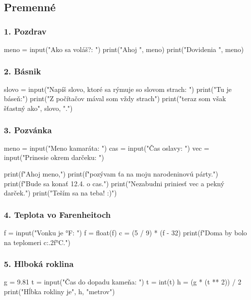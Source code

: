 \subsection{Premenné}
\subsubsection*{1. Pozdrav}
\begin{solution}
meno = input("Ako sa voláš?: ")
print("Ahoj ", meno)
print("Dovidenia ", meno)
\end{solution}

\subsubsection*{2. Básnik}
\begin{solution}
slovo = input("Napíš slovo, ktoré sa rýmuje so slovom strach: ")
print("Tu je báseň:")
print("Z počítačov mával som vždy strach")
print("teraz som však šťastný ako", slovo, ".")
\end{solution}

\subsubsection*{3. Pozvánka}
\begin{solution}
meno = input("Meno kamaráta: ")
cas = input("Čas oslavy: ")
vec = input("Prinesie okrem darčeku: ")

print(f"Ahoj {meno},")
print(f"pozývam ťa na moju narodeninovú párty.")
print(f"Bude sa konať 12.4. o {cas}.")
print("Nezabudni priniesť {vec} a pekný darček.")
print("Teším sa na teba! :)")
\end{solution}

\subsubsection*{4. Teplota vo Farenheitoch}
\begin{solution}
f = input("Vonku je °F: ")
f = float(f)
c = (5 / 9) * (f - 32)
print(f"Doma by bolo na teplomeri {c:.2f}°C.")
\end{solution}

\subsubsection*{5. Hlboká roklina}
\begin{solution}
g = 9.81
t = input("Čas do dopadu kameňa: ")
t = int(t)
h = (g * (t ** 2)) / 2
print("Hĺbka rokliny je", h, "metrov")
\end{solution}

